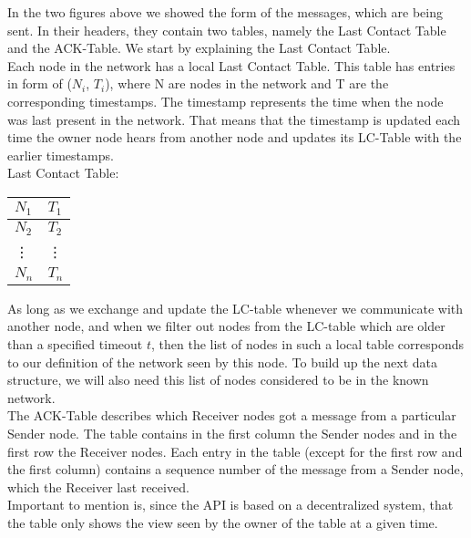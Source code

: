 In the two figures above we showed the form of the messages, which are being sent. In their headers, they contain two tables, namely the Last Contact Table and the ACK-Table. We start by explaining the Last Contact Table. \\

Each node in the network has a local Last Contact Table. This table has entries in form of ($N_{i}$, $T_{i}$), where N are nodes in the network and T are the corresponding timestamps. The timestamp represents the time when the node was last present in the network. That means that the timestamp is updated each time the owner node hears from another node and updates its LC-Table with the earlier timestamps. \\

	Last Contact Table:
		\begin{center}
			\begin{tabular}{ | l | l |}
				\hline
				$N_{1}$ & $T_{1}$ \\ \hline
				$N_{2}$ & $T_{2}$ \\ \hline
				\vdots & \vdots \\ \hline
				$N_{n}$ & $T_{n}$ \\ 
				\hline
			\end{tabular}
		\end{center}

As long as we exchange and update the LC-table whenever we communicate with another node, and when we filter out nodes from the LC-table which are older than a specified timeout $t$, then the list of nodes in such a local table corresponds to our definition of the network seen by this node. To build up the next data structure, we will also need this list of nodes considered to be in the known network. \\

The ACK-Table describes which Receiver nodes got a message from a particular Sender node. The table contains in the first column the Sender nodes and in the first row the Receiver nodes. Each entry in the table (except for the first row and the first column) contains a sequence number of the message from a Sender node, which the Receiver last received. \\
Important to mention is, since the API is based on a decentralized system, that the table only shows the view seen by the owner of the table at a given time. \\

